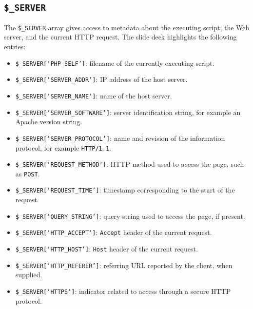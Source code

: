\documentclass{scrbook}
\begin{document}
	\subsection{\texttt{\$\_SERVER}}
	
	The \texttt{\$\_SERVER} array gives access to metadata about the executing script, the Web server, and the current HTTP request. The slide deck highlights the following entries:
	
	\begin{itemize}
		\item \texttt{\$\_SERVER['PHP\_SELF']}: filename of the currently executing script.
		
		\item \texttt{\$\_SERVER['SERVER\_ADDR']}: IP address of the host server.
		
		\item \texttt{\$\_SERVER['SERVER\_NAME']}: name of the host server.
		
		\item \texttt{\$\_SERVER['SERVER\_SOFTWARE']}: server identification string, for example an Apache version string.
		
		\item \texttt{\$\_SERVER['SERVER\_PROTOCOL']}: name and revision of the information protocol, for example \texttt{HTTP/1.1}.
		
		\item \texttt{\$\_SERVER['REQUEST\_METHOD']}: HTTP method used to access the page, such as \texttt{POST}.
		
		\item \texttt{\$\_SERVER['REQUEST\_TIME']}: timestamp corresponding to the start of the request.
		
		\item \texttt{\$\_SERVER['QUERY\_STRING']}: query string used to access the page, if present.
		
		\item \texttt{\$\_SERVER['HTTP\_ACCEPT']}: \texttt{Accept} header of the current request.
		
		\item \texttt{\$\_SERVER['HTTP\_HOST']}: \texttt{Host} header of the current request.
		
		\item \texttt{\$\_SERVER['HTTP\_REFERER']}: referring URL reported by the client, when supplied.
		
		\item \texttt{\$\_SERVER['HTTPS']}: indicator related to access through a secure HTTP protocol.
		

\end{itemize}
\end{document}
